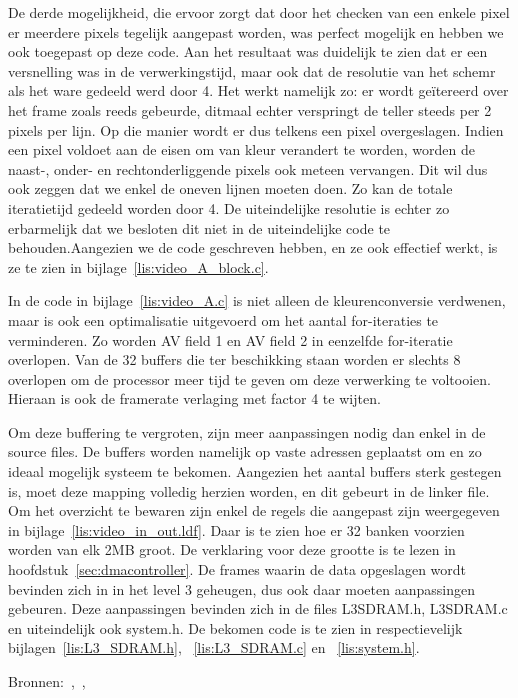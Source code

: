 	\par De derde mogelijkheid, die ervoor zorgt dat door het checken van een enkele pixel er meerdere pixels tegelijk aangepast worden, was perfect mogelijk en hebben we ook toegepast op deze code. Aan het resultaat was duidelijk te zien dat er een versnelling was in de verwerkingstijd, maar ook dat de resolutie van het schemr als het ware gedeeld werd door 4. Het werkt namelijk zo: er wordt ge\"itereerd over het frame zoals reeds gebeurde, ditmaal echter verspringt de teller steeds per 2 pixels per lijn. Op die manier wordt er dus telkens een pixel overgeslagen. Indien een pixel voldoet aan de eisen om van kleur verandert te worden, worden de naast-, onder- en rechtonderliggende pixels ook meteen vervangen. Dit wil dus ook zeggen dat we enkel de oneven lijnen moeten doen. Zo kan de totale iteratietijd gedeeld worden door 4. De uiteindelijke resolutie is echter zo erbarmelijk dat we besloten dit niet in de uiteindelijke code te behouden.Aangezien we de code geschreven hebben, en ze ook effectief werkt, is ze te zien in bijlage~\ref{lis:video_A_block.c}.

	\par In de code in bijlage~\ref{lis:video_A.c} is niet alleen de kleurenconversie verdwenen, maar is ook een optimalisatie uitgevoerd om het aantal for-iteraties te verminderen. Zo worden AV field 1 en AV field 2 in eenzelfde for-iteratie overlopen. Van de 32 buffers die ter beschikking staan worden er slechts 8 overlopen om de processor meer tijd te geven om deze verwerking te voltooien. Hieraan is ook de framerate verlaging met factor 4 te wijten.

	\par Om deze buffering te vergroten, zijn meer aanpassingen nodig dan enkel in de source files. De buffers worden namelijk op vaste adressen geplaatst om en zo ideaal mogelijk systeem te bekomen. Aangezien het aantal buffers sterk gestegen is, moet deze mapping volledig herzien worden, en dit gebeurt in de linker file. Om het overzicht te bewaren zijn enkel de regels die aangepast zijn weergegeven in bijlage~\ref{lis:video_in_out.ldf}. Daar is te zien hoe er 32 banken voorzien worden van elk 2MB groot. De verklaring voor deze grootte is te lezen in hoofdstuk~\ref{sec:dmacontroller}.
	De frames waarin de data opgeslagen wordt bevinden zich in in het level 3 geheugen, dus ook daar moeten aanpassingen gebeuren. Deze aanpassingen bevinden zich in de files L3\textunderscore SDRAM.h, L3\textunderscore SDRAM.c en uiteindelijk ook system.h. De bekomen code is te zien in respectievelijk bijlagen~\ref{lis:L3_SDRAM.h}, ~\ref{lis:L3_SDRAM.c} en ~\ref{lis:system.h}.

	\par Bronnen:~\cite{bib_12},~\cite{bib_13},~\cite{bib_11}